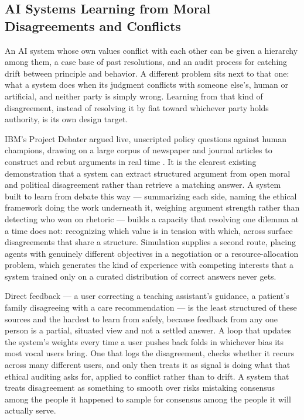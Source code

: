 \subsection{AI Systems Learning from Moral Disagreements and Conflicts}
\label{sec:5.3.3}
An AI system whose own values conflict with each other can be given a hierarchy among them, a case base of past resolutions, and an audit process for catching drift between principle and behavior. A different problem sits next to that one: what a system does when its judgment conflicts with someone else's, human or artificial, and neither party is simply wrong. Learning from that kind of disagreement, instead of resolving it by fiat toward whichever party holds authority, is its own design target.

IBM's Project Debater argued live, unscripted policy questions against human champions, drawing on a large corpus of newspaper and journal articles to construct and rebut arguments in real time \autocite{slonim2021autonomous}. It is the clearest existing demonstration that a system can extract structured argument from open moral and political disagreement rather than retrieve a matching answer. A system built to learn from debate this way — summarizing each side, naming the ethical framework doing the work underneath it, weighing argument strength rather than detecting who won on rhetoric — builds a capacity that resolving one dilemma at a time does not: recognizing which value is in tension with which, across surface disagreements that share a structure. Simulation supplies a second route, placing agents with genuinely different objectives in a negotiation or a resource-allocation problem, which generates the kind of experience with competing interests that a system trained only on a curated distribution of correct answers never gets.

Direct feedback — a user correcting a teaching assistant's guidance, a patient's family disagreeing with a care recommendation — is the least structured of these sources and the hardest to learn from safely, because feedback from any one person is a partial, situated view and not a settled answer. A loop that updates the system's weights every time a user pushes back folds in whichever bias its most vocal users bring. One that logs the disagreement, checks whether it recurs across many different users, and only then treats it as signal is doing what that ethical auditing asks for, applied to conflict rather than to drift. A system that treats disagreement as something to smooth over risks mistaking consensus among the people it happened to sample for consensus among the people it will actually serve.
